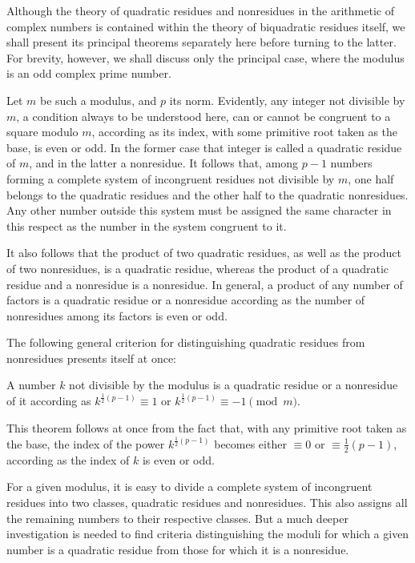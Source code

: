Although the theory of quadratic residues and nonresidues in the arithmetic of complex numbers is contained within the theory of biquadratic residues itself, we shall present its principal theorems separately here before turning to the latter. For brevity, however, we shall discuss only the principal case, where the modulus is an odd complex prime number.

Let $m$ be such a modulus, and $p$ its norm. Evidently, any integer not divisible by $m$, a condition always to be understood here, can or cannot be congruent to a square modulo $m$, according as its index, with some primitive root taken as the base, is even or odd. In the former case that integer is called a quadratic residue of $m$, and in the latter a nonresidue. It follows that, among $p-1$ numbers forming a complete system of incongruent residues not divisible by $m$, one half belongs to the quadratic residues and the other half to the quadratic nonresidues. Any other number outside this system must be assigned the same
%
character in this respect as the number in the system congruent to it.

It also follows that the product of two quadratic residues, as well as the product of two nonresidues, is a quadratic residue, whereas the product of a quadratic residue and a nonresidue is a nonresidue. In general, a product of any number of factors is a quadratic residue or a nonresidue according as the number of nonresidues among its factors is even or odd.

The following general criterion for distinguishing quadratic residues from nonresidues presents itself at once:

A number $k$ not divisible by the modulus is a quadratic residue or a nonresidue of it according as $k^{\frac12(p-1)}\equiv1$ or $k^{\frac12(p-1)}\equiv-1\pmod m$.

This theorem follows at once from the fact that, with any primitive root taken as the base, the index of the power $k^{\frac12(p-1)}$ becomes either $\equiv0$ or $\equiv\frac12(p-1)$, according as the index of $k$ is even or odd.

For a given modulus, it is easy to divide a complete system of incongruent residues into two classes, quadratic residues and nonresidues. This also assigns all the remaining numbers to their respective classes. But a much deeper investigation is needed to find criteria distinguishing the moduli for which a given number is a quadratic residue from those for which it is a nonresidue.

